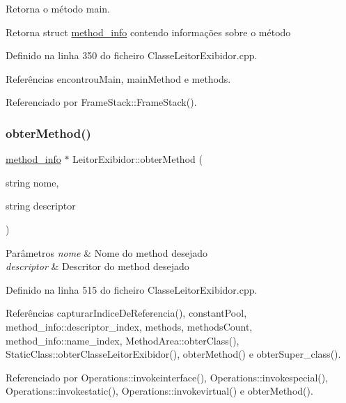 Retorna o método main. 

\begin{DoxyReturn}{Retorna}
struct \hyperlink{structmethod__info}{method\+\_\+info} contendo informações sobre o método 
\end{DoxyReturn}


Definido na linha 350 do ficheiro Classe\+Leitor\+Exibidor.\+cpp.



Referências encontrou\+Main, main\+Method e methods.



Referenciado por Frame\+Stack\+::\+Frame\+Stack().

\mbox{\label{classLeitorExibidor_a4d1a48fa9825d2cb2b520be79112408c}} 
\subsubsection{\texorpdfstring{obter\+Method()}{obterMethod()}}
{\footnotesize\ttfamily \hyperlink{structmethod__info}{method\+\_\+info} $\ast$ Leitor\+Exibidor\+::obter\+Method (\begin{DoxyParamCaption}\item[{string}]{nome,  }\item[{string}]{descriptor }\end{DoxyParamCaption})}


\begin{DoxyParams}{Parâmetros}
{\em nome} & Nome do method desejado \\
\hline
{\em descriptor} & Descritor do method desejado \\
\hline
\end{DoxyParams}


Definido na linha 515 do ficheiro Classe\+Leitor\+Exibidor.\+cpp.



Referências capturar\+Indice\+De\+Referencia(), constant\+Pool, method\+\_\+info\+::descriptor\+\_\+index, methods, methods\+Count, method\+\_\+info\+::name\+\_\+index, Method\+Area\+::obter\+Class(), Static\+Class\+::obter\+Classe\+Leitor\+Exibidor(), obter\+Method() e obter\+Super\+\_\+class().



Referenciado por Operations\+::invokeinterface(), Operations\+::invokespecial(), Operations\+::invokestatic(), Operations\+::invokevirtual() e obter\+Method().

